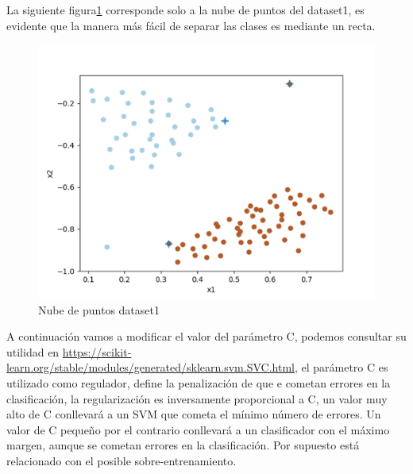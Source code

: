 La siguiente figura\ref{fig:Dataset1_1} corresponde solo a la nube de puntos del dataset1, es evidente que la manera más fácil de separar las clases es mediante un recta.
\begin{figure}[H]
    \centering
    \includegraphics[scale=1.2]{img/dataset1_1}
    \caption{Nube de puntos dataset1}
    \label{fig:Dataset1_1}
\end{figure}

A continuación vamos a modificar el valor del parámetro C, podemos consultar su utilidad en \url{https://scikit-learn.org/stable/modules/generated/sklearn.svm.SVC.html}, el parámetro C es utilizado como regulador, define la penalización de que e cometan errores en la clasificación, la regularización es inversamente proporcional a C, un valor muy alto de C conllevará a un SVM que cometa el mínimo número de errores. Un valor de C pequeño por el contrario conllevará a un clasificador con el máximo margen, aunque se cometan errores en la clasificación. Por supuesto está relacionado con el posible sobre-entrenamiento.

        

